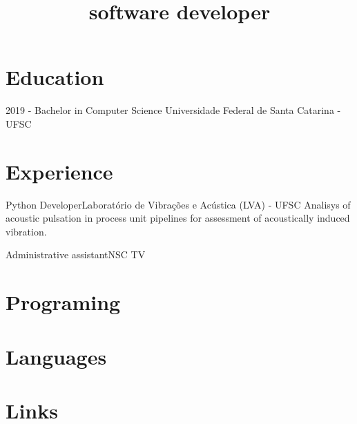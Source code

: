 \documentclass[11pt, a4paper]{moderncv}
\title{software developer}
\begin{document}
\makecvtitle{ }
\pagestyle{empty}

\section{Education}
    \cventry
        {2019 -}
        {Bachelor in Computer Science}
        {Universidade Federal de Santa Catarina - UFSC}{}{}{}

\section{Experience}
        {Python Developer}{Laboratório de Vibrações e Acústica (LVA) - UFSC}
        {}{}
        {   
             Analisys of acoustic pulsation in process unit pipelines for assessment of acoustically induced vibration. 
        }
    
        {Administrative assistant}{NSC TV}
        {}{}{}

\section{Programing}

\section{Languages}
    
\section{Links}

    
    
\thispagestyle{plain}
\end{document}
